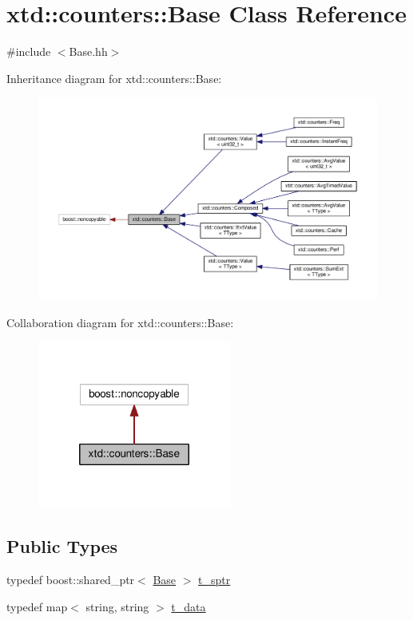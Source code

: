 \hypertarget{classxtd_1_1counters_1_1Base}{\section{xtd\-:\-:counters\-:\-:Base Class Reference}
\label{classxtd_1_1counters_1_1Base}
}


{\ttfamily \#include $<$Base.\-hh$>$}



Inheritance diagram for xtd\-:\-:counters\-:\-:Base\-:
\nopagebreak
\begin{figure}[H]
\begin{center}
\leavevmode
\includegraphics[width=350pt]{classxtd_1_1counters_1_1Base__inherit__graph}
\end{center}
\end{figure}


Collaboration diagram for xtd\-:\-:counters\-:\-:Base\-:
\nopagebreak
\begin{figure}[H]
\begin{center}
\leavevmode
\includegraphics[width=180pt]{classxtd_1_1counters_1_1Base__coll__graph}
\end{center}
\end{figure}
\subsection*{Public Types}
\begin{DoxyCompactItemize}
\item 
typedef boost\-::shared\-\_\-ptr$<$ \hyperlink{classxtd_1_1counters_1_1Base}{Base} $>$ \hyperlink{classxtd_1_1counters_1_1Base_aa0ea634f1a5e3df87418566a3e8fcbd6}{t\-\_\-sptr}
\item 
typedef map$<$ string, string $>$ \hyperlink{classxtd_1_1counters_1_1Base_a8bb7d024911a4c454c003a18e330d268}{t\-\_\-data}
\end{DoxyCompactItemize}
